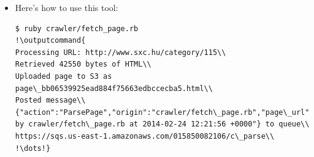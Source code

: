 \documentclass{beamer}
\newcommand{\outputcommand}[1]{\color{darkgreen}{#1|}}
\begin{document}
\begin{frame}
\begin{itemize}
\item Here’s how to use this tool:
\lstset{language=shell}
\begin{lstlisting}[escapechar=!]
$ ruby crawler/fetch_page.rb
!\outputcommand{
Processing URL: http://www.sxc.hu/category/115\\
Retrieved 42550 bytes of HTML\\
Uploaded page to S3 as page\_bb06539925ead884f75663edbccecba5.html\\
Posted message\\ {"action":"ParsePage","origin":"crawler/fetch\_page.rb","page\_url":"http://www.sxc.hu/category/115","data":"http://s3.amazonaws.com/developing\_cloud\_application\_bucket/page\_bb06539925ead884f75663edbccecba5.html","history":"Posted by crawler/fetch\_page.rb at 2014-02-24 12:21:56 +0000"} to queue\\ https://sqs.us-east-1.amazonaws.com/015850082106/c\_parse\\
!\dots!}
\end{lstlisting}
\end{itemize}
\end{frame}
\end{document}
